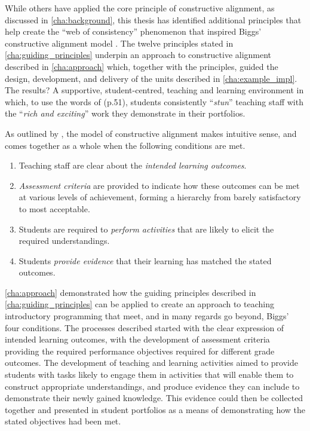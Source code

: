 While others have applied the core principle of constructive alignment, as discussed in \cref{cha:background}, this thesis has identified additional principles that help create the ``web of consistency'' phenomenon that inspired Biggs' constructive alignment model \citep{Biggs:1996c,Biggs:1999}. The twelve principles stated in \cref{cha:guiding_principles} underpin an approach to constructive alignment described in \cref{cha:approach} which, together with the principles, guided the design, development, and delivery of the units described in \cref{cha:example_impl}. The results? A supportive, student-centred, teaching and learning environment in which, to use the words of \citet{Biggs:2007} (p.51), students consistently ``\emph{stun}'' teaching staff with the ``\emph{rich and exciting}'' work they demonstrate in their portfolios.

As outlined by \citet{Biggs:1996c}, the model of constructive alignment makes intuitive sense, and comes together as a whole when the following conditions are met.
\begin{enumerate}
	\item Teaching staff are clear about the \emph{intended learning outcomes}.
	\item \emph{Assessment criteria} are provided to indicate how these outcomes can be met at various levels of achievement, forming a hierarchy from barely satisfactory to most acceptable.
	\item Students are required to \emph{perform activities} that are likely to elicit the required understandings.
	\item Students \emph{provide evidence} that their learning has matched the stated outcomes.
\end{enumerate}

\cref{cha:approach} demonstrated how the guiding principles described in \cref{cha:guiding_principles} can be applied to create an approach to teaching introductory programming that meet, and in many regards go beyond, Biggs' four conditions. The processes described started with the clear expression of intended learning outcomes, with the development of assessment criteria providing the required performance objectives required for different grade outcomes. The development of teaching and learning activities aimed to provide students with tasks likely to engage them in activities that will enable them to construct appropriate understandings, and produce evidence they can include to demonstrate their newly gained knowledge. This evidence could then be collected together and presented in student portfolios as a means of demonstrating how the stated objectives had been met.

